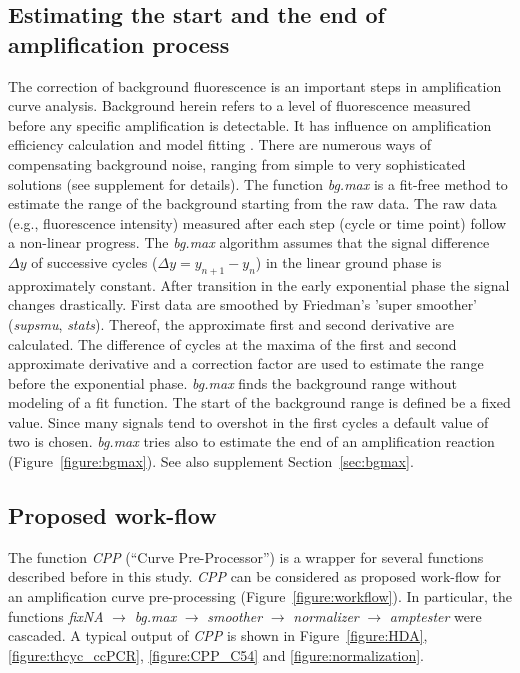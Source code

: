 \documentclass[twocolumn]{bmcart}%
\begin{document}
\subsection*{Estimating the start and the end of amplification process}

  The correction of background fluorescence is an important steps in 
amplification curve analysis. Background herein refers to a level of 
fluorescence measured before any specific amplification is detectable. It has 
influence on amplification efficiency calculation and model fitting 
\cite{tuomi_2010, rutledge_2008, ruijter_2009}. There are numerous ways of 
compensating background noise, ranging from simple to very sophisticated 
solutions (see supplement for details). The function 
\textsl{bg.max} is a fit-free method to estimate the range of the background 
starting from the raw data. The raw data (e.g., fluorescence intensity) measured 
after each step (cycle or time point) follow a non-linear progress. The 
\textsl{bg.max} algorithm assumes that the signal difference $\Delta{y}$ of 
successive cycles ($\Delta{y} = y_{n + 1} - y_n$) in the linear ground phase is 
approximately constant. After transition in the early exponential phase the 
signal changes drastically. First data are smoothed by Friedman’s ’super 
smoother’ (\textsl{supsmu}, \emph{stats}). Thereof, the approximate first and 
second derivative are calculated. The difference of cycles at the maxima of the 
first and second approximate derivative and a correction factor are used to 
estimate the range before the exponential phase. \textsl{bg.max} finds the 
background range without modeling of a fit function. The start of the background 
range is defined be a fixed value. Since many signals tend to overshot in the 
first cycles a default value of two is chosen. \textsl{bg.max} tries also to 
estimate the end of an amplification reaction (Figure~\ref{figure:bgmax}). See 
also supplement Section~\ref{sec:bgmax}.

\subsection*{Proposed work-flow}

The function \textsl{CPP} (``Curve Pre-Processor'') is a wrapper for several 
functions described before in this study. \textsl{CPP} can be considered as 
proposed work-flow for an amplification curve pre-processing 
(Figure~\ref{figure:workflow}). In particular, the functions \textsl{fixNA} 
$\rightarrow$ \textsl{bg.max} $\rightarrow$ \textsl{smoother} $\rightarrow$ 
\textsl{normalizer} $\rightarrow$ \textsl{amptester} were cascaded. A typical 
output of \textsl{CPP} is shown in Figure~\ref{figure:HDA}, 
\ref{figure:thcyc_ccPCR}, \ref{figure:CPP_C54} and \ref{figure:normalization}.
\end{document}
